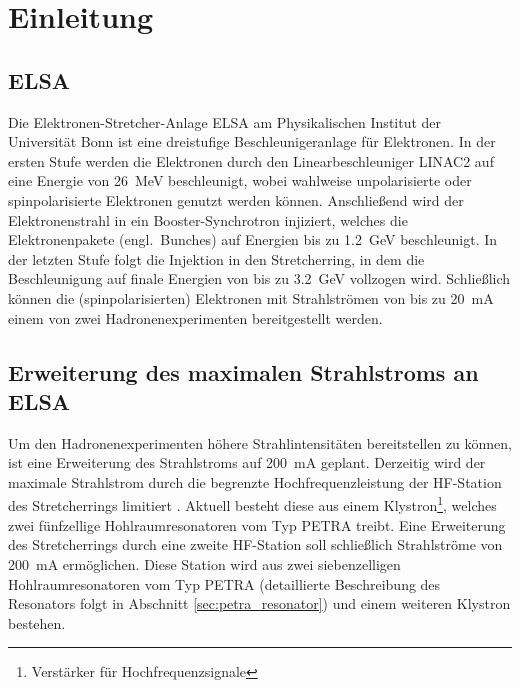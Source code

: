 \chapter{Einleitung}
\label{sec:einleitung}

\section{ELSA}
Die Elektronen-Stretcher-Anlage ELSA am Physikalischen Institut der Universität Bonn ist eine dreistufige Beschleunigeranlage für Elektronen.
In der ersten Stufe werden die Elektronen durch den Linearbeschleuniger LINAC2 auf eine Energie von \SI{26}{MeV} beschleunigt, wobei wahlweise unpolarisierte oder spinpolarisierte Elektronen genutzt werden können.
Anschließend wird der Elektronenstrahl in ein Booster-Synchrotron injiziert, welches die Elektronenpakete (engl.\ Bunches) auf Energien bis zu \SI{1.2}{GeV} beschleunigt.
In der letzten Stufe folgt die Injektion in den Stretcherring, in dem die Beschleunigung auf finale Energien von bis zu \SI{3.2}{GeV} vollzogen wird.
Schließlich können die (spinpolarisierten) Elektronen mit Strahlströmen von bis zu \SI{20}{mA} einem von zwei Hadronenexperimenten bereitgestellt werden.


\section{Erweiterung des maximalen Strahlstroms an ELSA}
Um den Hadronenexperimenten höhere Strahlintensitäten bereitstellen zu können, ist eine Erweiterung des Strahlstroms auf \SI{200}{mA} geplant.
Derzeitig wird der maximale Strahlstrom durch die begrenzte Hochfrequenzleistung der HF-Station des Stretcherrings limitiert \cite{schedler}.
Aktuell besteht diese aus einem Klystron\footnote{Verstärker für Hochfrequenzsignale}, welches zwei fünfzellige Hohlraumresonatoren vom Typ PETRA treibt.
Eine Erweiterung des Stretcherrings durch eine zweite HF-Station soll schließlich Strahlströme von \SI{200}{mA} ermöglichen.
Diese Station wird aus zwei siebenzelligen Hohlraumresonatoren vom Typ PETRA (detaillierte Beschreibung des Resonators folgt in Abschnitt \ref{sec:petra_resonator}) und einem weiteren Klystron bestehen.

